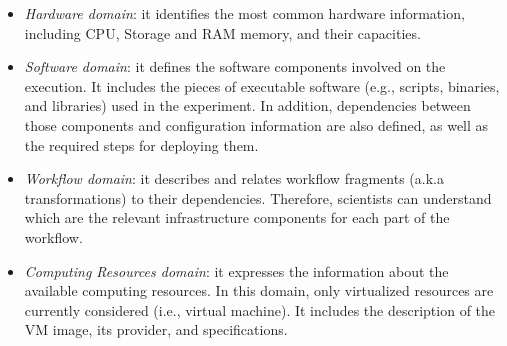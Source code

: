 \begin{itemize}
	\setlength{\itemsep}{1pt}
	\setlength{\parskip}{0pt}
	\setlength{\parsep}{0pt}

	\item{\emph{Hardware domain}}: it identifies the most common hardware information, 
		including CPU, Storage and RAM memory, and their capacities.
	
	\item{\emph{Software domain}}: it defines the software components involved on the execution. 
    		It includes the pieces of executable software (e.g., scripts, binaries, and libraries) used in 
		the experiment. In addition, dependencies between those components and configuration 
		information are also defined, as well as the required steps for deploying them.
	
	\item{\emph{Workflow domain}}: it describes and relates workflow fragments (a.k.a transformations) 
    		to their dependencies. Therefore, scientists can understand which are the relevant infrastructure 
		components for each part of the workflow.
	
	\item{\emph{Computing Resources domain}}: it expresses the information about the available 
    		computing resources. In this domain, only virtualized resources are currently considered 
		(i.e., virtual machine). It includes the description of the VM image, its provider, and specifications.
\end{itemize}